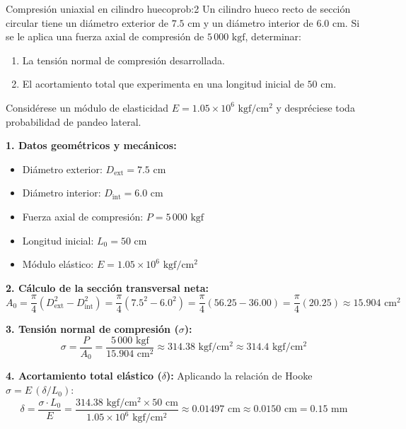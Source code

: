 \vspace{1em}

\begin{question}{Compresión uniaxial en cilindro hueco}{prob:2}
    Un cilindro hueco recto de sección circular tiene un diámetro exterior de $7.5\text{ cm}$ y un diámetro interior de $6.0\text{ cm}$. Si se le aplica una fuerza axial de compresión de $5\,000\text{ kgf}$, determinar:
    \begin{enumerate}[label=\alph*)]
        \item La tensión normal de compresión desarrollada.
        \item El acortamiento total que experimenta en una longitud inicial de $50\text{ cm}$.
    \end{enumerate}
    Considérese un módulo de elasticidad $E = 1.05 \times 10^6\text{ kgf}/\text{cm}^2$ y despréciese toda probabilidad de pandeo lateral.
\end{question}

\solve{}
\textbf{1. Datos geométricos y mecánicos:}
\begin{itemize}
    \item Diámetro exterior: $D_{\text{ext}} = 7.5\text{ cm}$
    \item Diámetro interior: $D_{\text{int}} = 6.0\text{ cm}$
    \item Fuerza axial de compresión: $P = 5\,000\text{ kgf}$
    \item Longitud inicial: $L_0 = 50\text{ cm}$
    \item Módulo elástico: $E = 1.05 \times 10^6\text{ kgf}/\text{cm}^2$
\end{itemize}

\textbf{2. Cálculo de la sección transversal neta:}
\begin{equation*}
    A_0 = \frac{\pi}{4} \left(D_{\text{ext}}^2 - D_{\text{int}}^2\right) = \frac{\pi}{4} \left(7.5^2 - 6.0^2\right) = \frac{\pi}{4} (56.25 - 36.00) = \frac{\pi}{4} (20.25) \approx 15.904\text{ cm}^2
\end{equation*}

\textbf{3. Tensión normal de compresión ($\sigma$):}
\begin{equation*}
    \sigma = \frac{P}{A_0} = \frac{5\,000\text{ kgf}}{15.904\text{ cm}^2} \approx 314.38\text{ kgf}/\text{cm}^2 \approx 314.4\text{ kgf}/\text{cm}^2
\end{equation*}

\textbf{4. Acortamiento total elástico ($\delta$):}
Aplicando la relación de Hooke $\sigma = E \, (\delta / L_0)$:
\begin{equation*}
    \delta = \frac{\sigma \cdot L_0}{E} = \frac{314.38\text{ kgf}/\text{cm}^2 \times 50\text{ cm}}{1.05 \times 10^6\text{ kgf}/\text{cm}^2} \approx 0.01497\text{ cm} \approx 0.0150\text{ cm} = 0.15\text{ mm}
\end{equation*}


